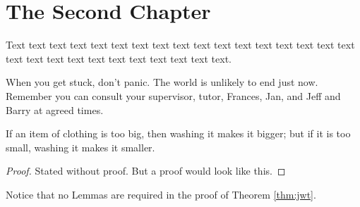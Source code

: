 \chapter{The Second Chapter}

Text text text text text text text text text text text text text text
text text text text text text text text text text text text text text.

When you get stuck, don't panic. 
The world is unlikely to end just now. 
Remember you can consult your supervisor, tutor, Frances, Jan, 
and Jeff and Barry at agreed times. 

\begin{thm}
\label{thm:jwt}
If an item of clothing is too big, then washing it makes it bigger;
but if it is too small, washing it makes it smaller.
\end{thm}
\begin{proof}
Stated without proof. But a proof would look like this. 
\end{proof}

Notice that no Lemmas are required in the proof of Theorem \ref{thm:jwt}.
